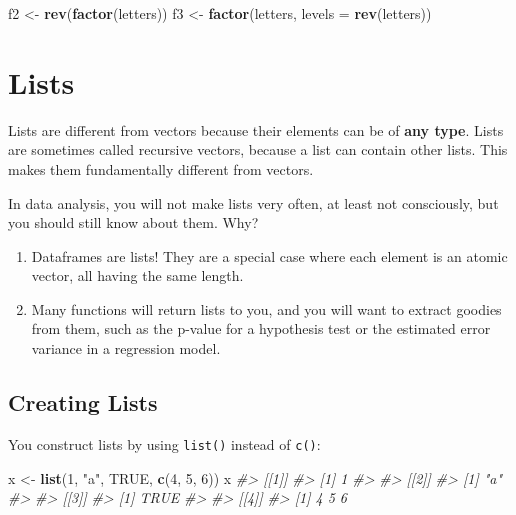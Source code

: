 \documentclass[
]{book}
\newenvironment{Shaded}{\begin{snugshade}}{\end{snugshade}}
\newcommand{\CommentTok}[1]{\textcolor[rgb]{0.56,0.35,0.01}{\textit{#1}}}
\newcommand{\DataTypeTok}[1]{\textcolor[rgb]{0.13,0.29,0.53}{#1}}
\newcommand{\DecValTok}[1]{\textcolor[rgb]{0.00,0.00,0.81}{#1}}
\newcommand{\KeywordTok}[1]{\textcolor[rgb]{0.13,0.29,0.53}{\textbf{#1}}}
\newcommand{\NormalTok}[1]{#1}
\newcommand{\OtherTok}[1]{\textcolor[rgb]{0.56,0.35,0.01}{#1}}
\newcommand{\StringTok}[1]{\textcolor[rgb]{0.31,0.60,0.02}{#1}}
\providecommand{\tightlist}{%
  \setlength{\itemsep}{0pt}\setlength{\parskip}{0pt}}
\begin{document}
\begin{Shaded}
\begin{Highlighting}[]
\NormalTok{f2 <-}\StringTok{ }\KeywordTok{rev}\NormalTok{(}\KeywordTok{factor}\NormalTok{(letters))}
\NormalTok{f3 <-}\StringTok{ }\KeywordTok{factor}\NormalTok{(letters, }\DataTypeTok{levels =} \KeywordTok{rev}\NormalTok{(letters))}
\end{Highlighting}
\end{Shaded}

\hypertarget{lists}{%
\section{Lists}\label{lists}}

Lists are different from vectors because their elements can be of \textbf{any type}. Lists are sometimes called recursive vectors, because a list can contain other lists. This makes them fundamentally different from vectors.

In data analysis, you will not make lists very often, at least not consciously, but you should still know about them. Why?

\begin{enumerate}
\def\labelenumi{\arabic{enumi}.}
\tightlist
\item
  Dataframes are lists! They are a special case where each element is an atomic vector, all having the same length.
\item
  Many functions will return lists to you, and you will want to extract goodies from them, such as the p-value for a hypothesis test or the estimated error variance in a regression model.
\end{enumerate}

\hypertarget{creating-lists}{%
\subsection{Creating Lists}\label{creating-lists}}

You construct lists by using \texttt{list()} instead of \texttt{c()}:

\begin{Shaded}
\begin{Highlighting}[]
\NormalTok{x <-}\StringTok{ }\KeywordTok{list}\NormalTok{(}\DecValTok{1}\NormalTok{, }\StringTok{"a"}\NormalTok{, }\OtherTok{TRUE}\NormalTok{, }\KeywordTok{c}\NormalTok{(}\DecValTok{4}\NormalTok{, }\DecValTok{5}\NormalTok{, }\DecValTok{6}\NormalTok{))}
\NormalTok{x}
\CommentTok{#> [[1]]}
\CommentTok{#> [1] 1}
\CommentTok{#> }
\CommentTok{#> [[2]]}
\CommentTok{#> [1] "a"}
\CommentTok{#> }
\CommentTok{#> [[3]]}
\CommentTok{#> [1] TRUE}
\CommentTok{#> }
\CommentTok{#> [[4]]}
\CommentTok{#> [1] 4 5 6}
\end{Highlighting}
\end{Shaded}
\end{document}
